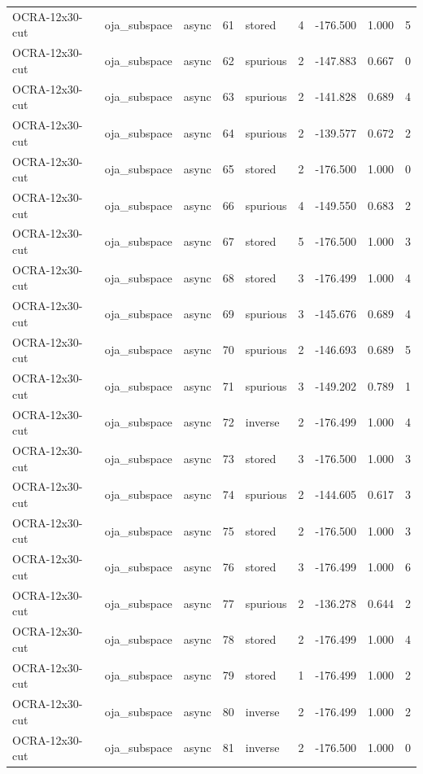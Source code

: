 \begin{tabular}{lllrlrrrr}
OCRA-12x30-cut & oja\_subspace & async & 61 & stored & 4 & -176.500 & 1.000 & 5 \\
OCRA-12x30-cut & oja\_subspace & async & 62 & spurious & 2 & -147.883 & 0.667 & 0 \\
OCRA-12x30-cut & oja\_subspace & async & 63 & spurious & 2 & -141.828 & 0.689 & 4 \\
OCRA-12x30-cut & oja\_subspace & async & 64 & spurious & 2 & -139.577 & 0.672 & 2 \\
OCRA-12x30-cut & oja\_subspace & async & 65 & stored & 2 & -176.500 & 1.000 & 0 \\
OCRA-12x30-cut & oja\_subspace & async & 66 & spurious & 4 & -149.550 & 0.683 & 2 \\
OCRA-12x30-cut & oja\_subspace & async & 67 & stored & 5 & -176.500 & 1.000 & 3 \\
OCRA-12x30-cut & oja\_subspace & async & 68 & stored & 3 & -176.499 & 1.000 & 4 \\
OCRA-12x30-cut & oja\_subspace & async & 69 & spurious & 3 & -145.676 & 0.689 & 4 \\
OCRA-12x30-cut & oja\_subspace & async & 70 & spurious & 2 & -146.693 & 0.689 & 5 \\
OCRA-12x30-cut & oja\_subspace & async & 71 & spurious & 3 & -149.202 & 0.789 & 1 \\
OCRA-12x30-cut & oja\_subspace & async & 72 & inverse & 2 & -176.499 & 1.000 & 4 \\
OCRA-12x30-cut & oja\_subspace & async & 73 & stored & 3 & -176.500 & 1.000 & 3 \\
OCRA-12x30-cut & oja\_subspace & async & 74 & spurious & 2 & -144.605 & 0.617 & 3 \\
OCRA-12x30-cut & oja\_subspace & async & 75 & stored & 2 & -176.500 & 1.000 & 3 \\
OCRA-12x30-cut & oja\_subspace & async & 76 & stored & 3 & -176.499 & 1.000 & 6 \\
OCRA-12x30-cut & oja\_subspace & async & 77 & spurious & 2 & -136.278 & 0.644 & 2 \\
OCRA-12x30-cut & oja\_subspace & async & 78 & stored & 2 & -176.499 & 1.000 & 4 \\
OCRA-12x30-cut & oja\_subspace & async & 79 & stored & 1 & -176.499 & 1.000 & 2 \\
OCRA-12x30-cut & oja\_subspace & async & 80 & inverse & 2 & -176.499 & 1.000 & 2 \\
OCRA-12x30-cut & oja\_subspace & async & 81 & inverse & 2 & -176.500 & 1.000 & 0 \\

\end{tabular}

